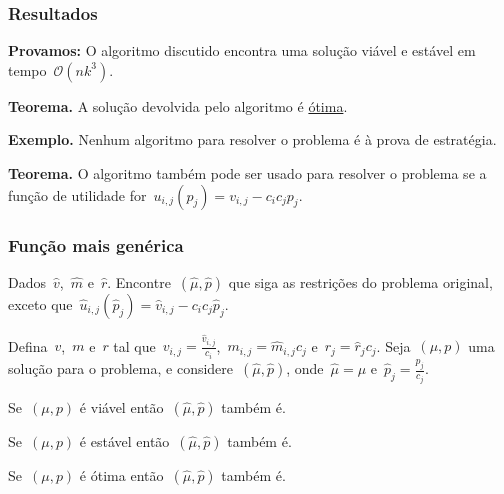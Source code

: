 \documentclass[10pt, compress]{beamer}
\newcommand{\Oh}{\mathcal{O}}
\begin{document}
\begin{frame}[fragile]
	\frametitle{Resultados}
	\textbf{Provamos:} O algoritmo discutido encontra uma solução viável e estável em tempo~$\Oh(n k^3)$.
	\vfill

	\textbf{Teorema.} A solução devolvida pelo algoritmo é \hyperlink{solucao}{\alert{ótima}}.
	\vfill

	\textbf{Exemplo.} Nenhum algoritmo para resolver o problema é à prova de estratégia.
	\vfill

	\textbf{Teorema.} O algoritmo também pode ser usado para resolver o problema se a função de utilidade for~$u_{i,j}(p_j) = v_{i, j} - c_i c_j p_j$.

\end{frame}

\begin{frame}[fragile]
	\frametitle{Função mais genérica}
	Dados~$\hat{v}$,~$\hat{m}$ e~$\hat{r}$. Encontre~$(\hat{\mu}, \hat{p})$ que siga as restrições do problema original, exceto que~$\hat{u}_{i,j}(\hat{p}_j) = \hat{v}_{i,j} - c_i c_j \hat{p}_j$.
	\vfill

	Defina~$v$,~$m$ e~$r$ tal que~$v_{i, j} = \frac{\hat{v}_{i, j}}{c_i}$,~$m_{i,j} = \hat{m}_{i,j} c_j$ e~$r_j = \hat{r}_j c_j$. Seja~$(\mu, p)$ uma solução para o problema, e considere~$(\hat{\mu}, \hat{p})$, onde~$\hat{\mu} = \mu$ e~$\hat{p}_j = \frac{p_j}{c_j}$.
	\vfill

	Se~$(\mu, p)$ é \alert{viável} então~$(\hat{\mu}, \hat{p})$ também é. \onslide<2->{\alert{\checkmark}}
	\vfill

	Se~$(\mu, p)$ é \alert{estável} então~$(\hat{\mu}, \hat{p})$ também é. \onslide<3->{\alert{\checkmark}}
	\vfill

	Se~$(\mu, p)$ é \alert{ótima} então~$(\hat{\mu}, \hat{p})$ também é. \onslide<4->{\alert{\checkmark}}
\end{frame}

\end{document}
